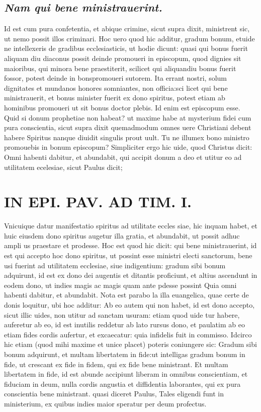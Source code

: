 \documentclass{article}
\begin{document}
\begin{pages}
\subsection*{\textit{Nam qui bene ministrauerint. }}\pstart Id est cum pura confetentia, et abique crimine, sicut supra dixit, ministrent sic, ut nemo possit illos criminari. Hoc uero quod hic additur, gradum bonum, etuide ne intellexeris de gradibus ecclesiasticis, ut hodie dicunt: quasi qui bonus fuerit aliquam diu diaconus possit deinde promoueri in episcopum, quod dignies sit maioribus, qui minora bene praestiterit, scilicet qui aliquandiu bonus fuerit fossor, potest deinde in bonspromoueri sutorem. Ita errant nostri, solum dignitates et mundanos honores somniantes, non officia:sci licet qui bene ministrauerit, et bonus minister fuerit ex dono spiritus, potest etiam ab hominibus promoueri ut sit bonus doctor plebis. Id enim est episcopum esse. Quid si donum prophetiae non habeat? ut maxime habe at mysterium fidei cum pura conscientia, sicut supra dixit quemadmodum omnes uere Christiani debent habere Spiritus nanque diuidit singulis prout uult. Tu ne illumex bono ministro promouebis in bonum episcopum? Simpliciter ergo hic uide, quod Christus dicit: Omni habenti dabitur, et abundabit, qui accipit donum a deo et utitur eo ad utilitatem ecelesiae, sicut Paulus dicit;  \pend
\section*{IN EPI. PAV. AD TIM. I. }
\marginpar{[ p.88 ]}\pstart Vnicuique datur manifestatio spiritus ad utilitate eccles siae, hic inquam habet, et huic eiusdem dono spiritus augetur illa gratia, et abundabit, ut possit adhuc ampli us praestare et prodesse. Hoc est quod hic dicit: qui bene ministrauerint, id est qui accepto hoc dono spiritus, ut possint esse ministri electi sanctorum, bene usi fuerint ad utilitatem ecclesiae, siue indigentium: gradum sibi bonum adquirunt, id est ex dono dei augentis et ditantis proficiunt, et altius ascendunt in eodem dono, ut indies magis ac magis quam ante pdesse possint Quia omni habenti dabitur, et abundabit. Nota est parabo la illa euangelica, quae certe de donis loquitur, ubi hoc additur: Ab eo autem qui non habet, id est dono accepto, sicut illic uides, non utitur ad sanctam usuram: etiam quod uide tur habere, auferetur ab eo, id est inutilis reddetur ab lato rursus dono, et paulatim ab eo etiam fides cordis aufertur, et excaecatur: quia infidelis fuit in commisso. Idcirco hic etiam (quod mihi maxime et unice placet) poteris coniungere sic: Gradum sibi bonum adquirunt, et multam libertatem in fide:ut intelligas gradum bonum in fide, ut crescant ex fide in fidem, qui ex fide bene ministrant. Et multam libertatem in fide, id est abunde accipiunt liberam in omnibus conscientiam, et fiduciam in deum, nulla cordis angustia et diffidentia laborantes, qui ex pura conscientia bene ministrant. quasi diceret Paulus, Tales eligendi funt in ministerium, ex quibus indies maior speratur per deum profectus.  \pend
{}
{}

\end{pages}
\end{document}
